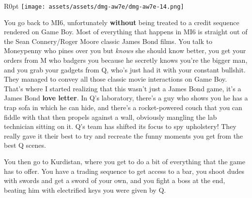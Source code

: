 \documentclass{book}
\begin{document}
\begin{wrapfigure}{R}{0pt} \texttt{[image: assets/assets/dmg-aw7e/dmg-aw7e-14.png]}\end{wrapfigure}
You go back to MI6, unfortunately \textbf{without} being treated to a credit sequence rendered on Game Boy. Most of everything that happens in MI6 is straight out of the Sean Connery/Roger Moore classic James Bond films. You talk to Moneypenny who pines over you but \emph{knows} she should know better, you get your orders from M who badgers you because he secretly knows you’re the bigger man, and you grab your gadgets from Q, who’s just had it with your constant bullshit. They managed to convey all those classic movie interactions on Game Boy. That’s where I started realizing that this wasn’t just a James Bond game, it’s a James Bond \textbf{love letter}. In Q’s laboratory, there’s a guy who shows you he has a trap sofa in which he can hide, and there’s a rocket-powered couch that you can fiddle with that then propels against a wall, obviously mangling the lab technician sitting on it. Q’s team has shifted its focus to spy upholstery! They really gave it their best to try and recreate the funny moments you get from the best Q scenes.

You then go to Kurdistan, where you get to do a bit of everything that the game has to offer. You have a trading sequence to get access to a bar, you shoot dudes with swords and get a sword of your own, and you fight a boss at the end, beating him with electrified keys you were given by Q.
\end{document}

